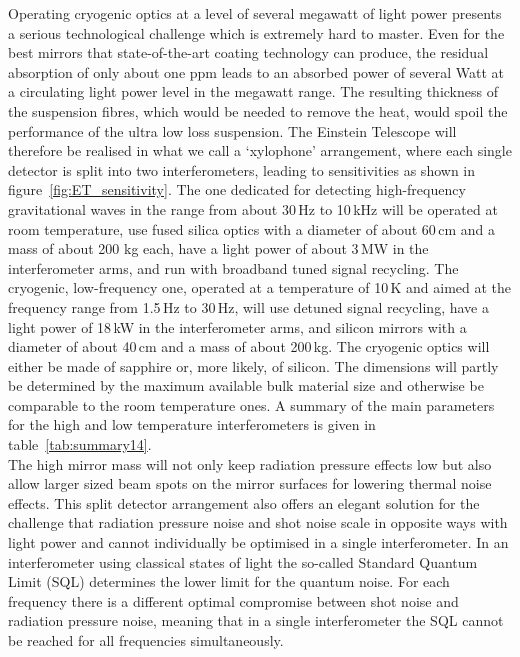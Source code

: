 Operating cryogenic optics at a level of several megawatt of light power presents 
a serious technological challenge which is extremely hard to master. Even for 
the best mirrors that state-of-the-art coating technology can produce, the 
residual absorption of only about one ppm leads to an absorbed power of 
several Watt at a circulating light power level in the megawatt range. The resulting 
thickness of the suspension fibres, which would be needed to remove the heat, 
would spoil the performance of the ultra low loss suspension. The Einstein 
Telescope will therefore be realised in what we call a `xylophone' arrangement, 
where each single detector is split into two interferometers, leading to sensitivities 
as shown in figure~\ref{fig:ET_sensitivity}. The one dedicated for detecting 
high-frequency gravitational waves in the range from about 30\,Hz to 10\,kHz 
will be operated at room temperature, use fused silica optics with a diameter of 
about 60\,cm and a mass of about 200 kg each, have a light power of about 3\,MW 
in the interferometer arms, and run with broadband tuned signal recycling. The 
cryogenic, low-frequency one, operated at a temperature of 10\,K and aimed at the 
frequency range from 1.5\,Hz to 30\,Hz, will use detuned signal recycling, have a 
light power of 18\,kW 
in the interferometer arms, and silicon mirrors with a diameter of about 40\,cm and 
a mass of about 200\,kg. The cryogenic optics will either be made of sapphire or, 
more likely, of silicon. The dimensions will partly be determined by the maximum 
available bulk material size and otherwise be comparable to the room temperature 
ones. A summary of the main parameters for the high and low temperature 
interferometers is given in table~\ref{tab:summary14}.\\
The high mirror mass will not only keep radiation pressure effects low but also 
allow larger sized beam spots on the mirror surfaces for lowering thermal noise 
effects. This split detector arrangement also offers an elegant solution for the 
challenge that radiation pressure noise and shot noise scale in opposite ways with 
light power and cannot individually be optimised in a single interferometer. In an 
interferometer using classical states of light the so-called Standard Quantum 
Limit (SQL) determines the lower limit for the quantum noise. For each frequency 
there is a different optimal compromise between shot noise and radiation pressure 
noise, meaning that in a single interferometer the SQL cannot be reached for all 
frequencies simultaneously. 
 
